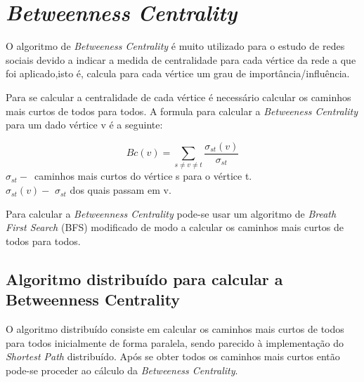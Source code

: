 \section{\textit{Betweenness Centrality}}

O algoritmo de \textit{Betweeness Centrality} é muito utilizado para o estudo 
de 
redes sociais devido a indicar a medida de centralidade para cada vértice da 
rede a que foi aplicado,isto é, calcula para cada vértice um grau de 
importância/influência. 

Para se calcular a centralidade de cada vértice é necessário calcular os 
caminhos mais curtos de todos para todos. A formula para calcular a 
\textit{Betweeness Centrality} para um dado vértice v é a seguinte:
\begin{center}
	\begin{equation}
		Bc(v) = \sum\limits_{s \neq v \neq t} 
\frac{\sigma_{st}(v)}{\sigma_{st}}
		\label{eq:bc}
	\end{equation}
	$\sigma_{st}-$~caminhos mais curtos do vértice s para o vértice t.\\
	$\sigma_{st}(v)-$ $\sigma_{st}$ dos quais passam em v.\\
\end{center}

Para calcular a \textit{Betweenness Centrality} pode-se usar um algoritmo de 
\textit{Breath First Search} (BFS) modificado de modo a calcular os caminhos 
mais curtos de todos para todos. 

\subsection{Algoritmo distribuído para calcular a Betweenness Centrality}
O algoritmo distribuído consiste em calcular os caminhos mais curtos de todos 
para todos inicialmente de forma paralela, sendo parecido à implementação do 
\textit{Shortest Path} distribuído. Após se obter todos os caminhos mais curtos 
então pode-se proceder ao cálculo da \textit{Betweeness Centrality}. 

